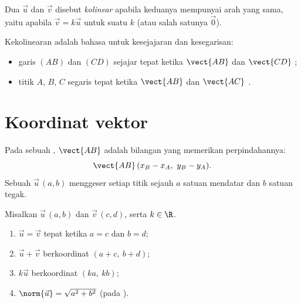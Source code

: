 \begin{definition}[Kekolinearan]\label{def:g10:vectors:collinear}
Dua  $\vec u$ dan $\vec v$ disebut
\emph{kolinear} apabila keduanya mempunyai arah yang
sama, yaitu apabila $\vec v = k \vec u$ untuk suatu  $k$ (atau
salah satunya $\vec 0$).
\end{definition}

\begin{remark}
Kekolinearan adalah bahasa  untuk kesejajaran dan kesegarisan:
\begin{itemize}
  \item garis $(AB)$ dan $(CD)$ sejajar tepat ketika $\vect{AB}$
        dan $\vect{CD}$ ;
  \item titik $A$, $B$, $C$ segaris tepat ketika $\vect{AB}$ dan
        $\vect{AC}$ .
\end{itemize}
\end{remark}

\section{Koordinat vektor}

\begin{definition}\label{def:g10:vectors:coords}
Pada sebuah , \emph{}  $\vect{AB}$
adalah bilangan yang memerikan perpindahannya:
\[
\vect{AB}\,(x_B - x_A,\ y_B - y_A).
\]
Sebuah  $\vec u\,(a, b)$ menggeser setiap titik sejauh $a$ satuan
mendatar dan $b$ satuan tegak.
\end{definition}

\begin{proposition}\label{prop:g10:vectors:coordrules}
Misalkan $\vec u\,(a, b)$ dan $\vec v\,(c, d)$, serta $k \in \R$.
\begin{enumerate}
  \item $\vec u = \vec v$ tepat ketika $a = c$ dan $b = d$;
  \item $\vec u + \vec v$ berkoordinat $(a + c,\ b + d)$;
  \item $k\vec u$ berkoordinat $(ka,\ kb)$;
  \item $\norm{\vec u} = \sqrt{a^2 + b^2}$ (pada ).
\end{enumerate}
\end{proposition}

